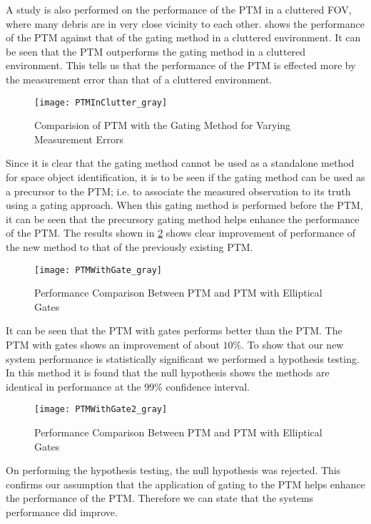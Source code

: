 \documentclass[]{aiaa-tc}%
\begin{document}
A study is also performed on the performance of the PTM in a cluttered FOV, where many debris are in very close vicinity to each other.  shows the performance of the PTM against that of the gating method in a cluttered environment. It can be seen that the PTM outperforms the gating method in a cluttered environment. This tells us that the performance of the PTM is effected more by the measurement error than that of a cluttered environment.\\

\begin{figure}[h]
\centering
\texttt{[image: PTMInClutter\_gray]}
\caption{Comparision of PTM with the Gating Method for Varying Measurement Errors}
\label{PTMInClutter}
\end{figure}

Since it is clear that the gating method cannot be used as a standalone method for space object identification, it is to be seen if the gating method can be used as a precursor to the PTM; i.e. to associate the measured observation to its truth using a gating approach. When this gating method is performed before the PTM, it can be seen that the precursory gating method helps enhance the performance of the PTM. The results shown in \cref{PTMWithGate} shows clear improvement of performance of the new method to that of the previously existing PTM.\\

\begin{figure}[h]
\centering
\texttt{[image: PTMWithGate\_gray]}
\caption{Performance Comparison Between PTM and PTM with Elliptical Gates}
\label{PTMWithGate}
\end{figure}

It can be seen that the PTM with gates performs better than the PTM. The PTM with gates shows an improvement of about $10 \%$. To show that our new system performance is statistically significant we performed a hypothesis testing. In this method it is found that the null hypothesis shows the methods are identical in performance at the $99\%$ confidence interval.\\

\begin{figure}[h]
\centering
\texttt{[image: PTMWithGate2\_gray]}
\caption{Performance Comparison Between PTM and PTM with Elliptical Gates}
\label{PTMWithGate2}
\end{figure}

On performing the hypothesis testing, the null hypothesis was rejected. This confirms our assumption that the application of gating to the PTM helps enhance the performance of the PTM. Therefore we can state that the systems performance did improve. \\
 
\end{document}

